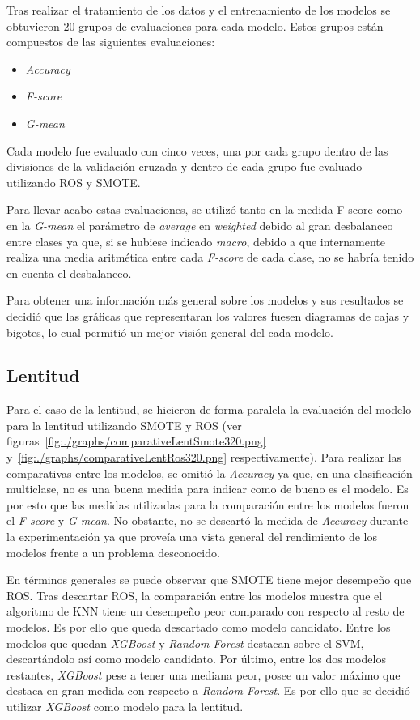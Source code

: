 Tras realizar el tratamiento de los datos y el entrenamiento de los modelos se obtuvieron 20 grupos de evaluaciones para cada modelo. Estos grupos están compuestos de las siguientes evaluaciones:
\begin{itemize}
\item \textit{Accuracy}
\item \textit{F-score}
\item \textit{G-mean}
\end{itemize}
Cada modelo fue evaluado con cinco veces, una por cada grupo dentro de las divisiones de la validación cruzada y dentro de cada grupo fue evaluado utilizando ROS y SMOTE.

Para llevar acabo estas evaluaciones, se utilizó tanto en la medida F-score como en la \textit{G-mean} el parámetro de \textit{average} en \textit{weighted} debido al gran desbalanceo entre clases ya que, si se hubiese indicado \textit{macro}, debido a que internamente realiza una media aritmética entre cada \textit{F-score} de cada clase, no se habría tenido en cuenta el desbalanceo.

Para obtener una información más general sobre los modelos y sus resultados se decidió que las gráficas que representaran los valores fuesen diagramas de cajas y bigotes, lo cual permitió un mejor visión general del cada modelo.

\subsection{Lentitud}
Para el caso de la lentitud, se hicieron de forma paralela la evaluación del modelo para la lentitud utilizando SMOTE y ROS (ver figuras~\ref{fig:./graphs/comparativeLentSmote320.png} y~\ref{fig:./graphs/comparativeLentRos320.png} respectivamente).
Para realizar las comparativas entre los modelos, se omitió la \textit{Accuracy} ya que, en una clasificación multiclase, no es una buena medida para indicar como de bueno es el modelo. Es por esto que las medidas utilizadas para la comparación entre los modelos fueron el \textit{F-score} y \textit{G-mean}. No obstante, no se descartó la medida de \textit{Accuracy} durante la experimentación ya que proveía una vista general del rendimiento de los modelos frente a un problema desconocido.

En términos generales se puede observar que SMOTE tiene mejor desempeño que ROS. Tras descartar ROS, la comparación entre los modelos muestra que el algoritmo de KNN tiene un desempeño peor comparado con respecto al resto de modelos. Es por ello que queda descartado como modelo candidato. Entre los modelos que quedan \textit{XGBoost} y \textit{Random Forest} destacan sobre el SVM, descartándolo así como modelo candidato. Por último, entre los dos modelos restantes, \textit{XGBoost} pese a tener una mediana peor, posee un valor máximo que destaca en gran medida con respecto a \textit{Random Forest}. Es por ello que se decidió utilizar \textit{XGBoost} como modelo para la lentitud.

